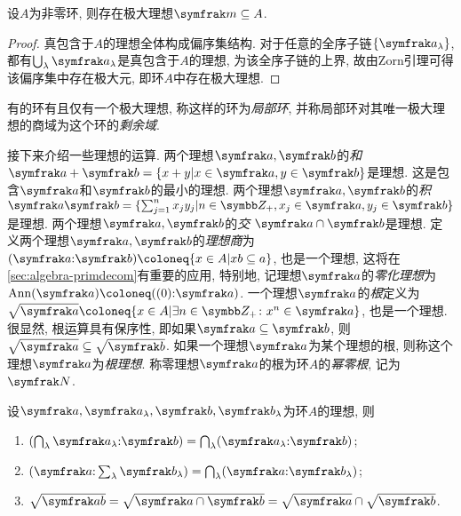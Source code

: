 \begin{theorem}\label{thm:maxideal}
  设$A$为非零环, 则存在极大理想$\ideal{m}\subseteq A$.
\end{theorem}

\begin{proof}
  真包含于$A$的理想全体构成偏序集结构. 对于任意的全序子链$\{\ideal{a}_\lambda\}$, 都有$\bigcup_{\lambda}\ideal{a}_\lambda$是真包含于$A$的理想, 为该全序子链的上界, 故由Zorn引理可得该偏序集中存在极大元, 即环$A$中存在极大理想.
\end{proof}

有的环有且仅有一个极大理想, 称这样的环为\emph{局部环}, 并称局部环对其唯一极大理想的商域为这个环的\emph{剩余域}.

接下来介绍一些理想的运算. 两个理想$\ideal{a}, \ideal{b}$的\emph{和} $\ideal{a}+\ideal{b}=\{x+y\vert x\in\ideal{a}, y\in\ideal{b}\}$是理想. 这是包含$\ideal{a}$和$\ideal{b}$的最小的理想. 两个理想$\ideal{a}, \ideal{b}$的\emph{积} $\ideal{a}\ideal{b}=\{\sum_{j=1}^n x_jy_j\vert n\in\ZZ_+, x_j\in\ideal{a}, y_j\in\ideal{b}\}$是理想. 两个理想$\ideal{a}, \ideal{b}$的\emph{交} $\ideal{a}\cap\ideal{b}$是理想. 定义两个理想$\ideal{a}, \ideal{b}$的\emph{理想商}为$(\ideal{a}{:}\ideal{b})\coloneq \{x\in A\vert xb\subseteq a\}$, 也是一个理想, 这将在\ref{sec:algebra-primdecom}有重要的应用, 特别地, 记理想$\ideal{a}$的\emph{零化理想}为$\Ann(\ideal{a})\coloneq ((0){:}\ideal{a})$. 一个理想$\ideal{a}$的\emph{根}定义为$\sqrt{\ideal{a}}\coloneq \{x\in A\vert \exists n\in\ZZ_+\colon x^n\in\ideal{a}\}$, 也是一个理想. 很显然, 根运算具有保序性, 即如果$\ideal{a}\subseteq\ideal{b}$, 则$\sqrt{\ideal{a}}\subseteq\sqrt{\ideal{b}}$. 如果一个理想$\ideal{a}$为某个理想的根, 则称这个理想$\ideal{a}$为\emph{根理想}. 称零理想$\ideal{a}$的根为环$A$的\emph{幂零根}, 记为$\nil$.

\begin{proposition}\label{prop:idealop}
  设$\ideal{a}, \ideal{a}_\lambda, \ideal{b}, \ideal{b}_\lambda$为环$A$的理想, 则
  \begin{enumerate}
    \item\label{enum:prop-idealop-quot-firstcap} $(\bigcap_\lambda \ideal{a}_\lambda{:}\ideal{b})=\bigcap_{\lambda}(\ideal{a}_\lambda{:}\ideal{b})$;
    \item $(\ideal{a}{:}\sum_{\lambda}\ideal{b}_\lambda)=\bigcap_{\lambda}(\ideal{a}{:}\ideal{b}_\lambda)$;
    \item\label{enum:prop-idealop-rad-inters} $\sqrt{\ideal{ab}}=\sqrt{\ideal{a}\cap\ideal{b}}=\sqrt{\ideal{a}}\cap\sqrt{\ideal{b}}$.
  \end{enumerate}
\end{proposition}

